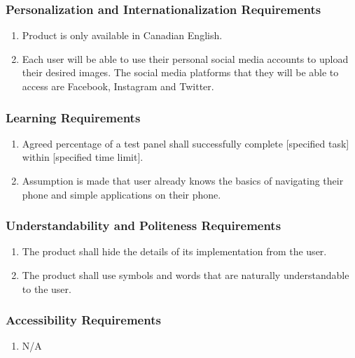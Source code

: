 \documentclass[]{article}
\begin{document}
\subsubsection{Personalization and Internationalization Requirements}
\label{ssub:personalization_and_internationalization_requirements}
\begin{enumerate}[{UH}1. ]
	\item Product is only available in Canadian English.
	\item Each user will be able to use their personal social media accounts to upload their desired images. The social media platforms that they will be able to access are Facebook, Instagram and Twitter. %
\end{enumerate}

\subsubsection{Learning Requirements}
\label{ssub:learning_requirements}
\begin{enumerate}[{UH}1. ]
	\item Agreed percentage of a test panel shall successfully complete [specified task] within [specified time limit]. %
	\item Assumption is made that user already knows the basics of navigating their phone and simple applications on their phone.
\end{enumerate}

\subsubsection{Understandability and Politeness Requirements}
\label{ssub:understandability_and_politeness_requirements}
\begin{enumerate}[{UH}1. ]
	\item The product shall hide the details of its implementation from the user.
	\item The product shall use symbols and words that are naturally understandable to the user.
\end{enumerate}

\subsubsection{Accessibility Requirements}
\label{ssub:accessibility_requirements}
\begin{enumerate}[{UH}1. ]
	\item N/A
\end{enumerate}
\end{document}
